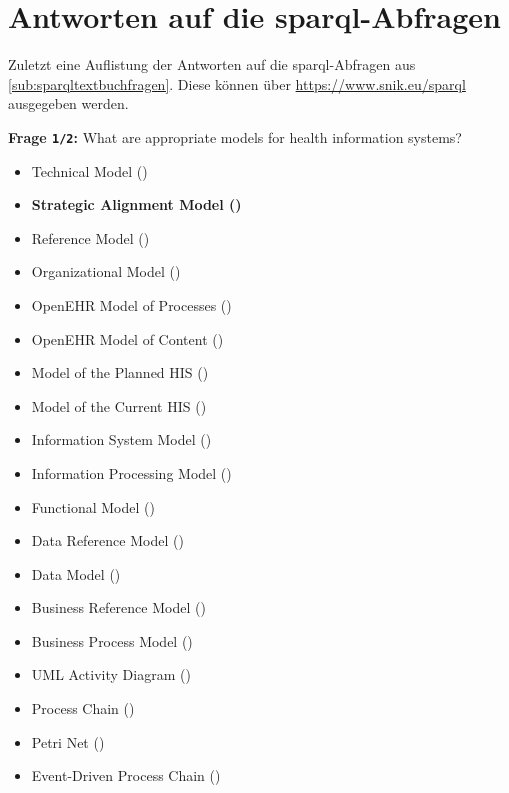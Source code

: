 \section[Antworten auf die SPARQL-Abfragen]{Antworten auf die \ac{sparql}-Abfragen}\label{sub:antwortentextbuch}

Zuletzt eine Auflistung der Antworten auf die \ac{sparql}-Abfragen aus \cref{sub:sparqltextbuchfragen}.
Diese können über \url{https://www.snik.eu/sparql} ausgegeben werden.

\textbf{Frage \texttt{1/2}:} What are appropriate models for health information systems?

\begin{itemize}
  \item Technical Model ()
  \item \textbf{ Strategic Alignment Model ()}
  \item Reference Model ()
  \item Organizational Model ()
  \item OpenEHR Model of Processes ()
  \item OpenEHR Model of Content ()
  \item Model of the Planned HIS ()
  \item Model of the Current HIS ()
  \item Information System Model ()
  \item Information Processing Model ()
  \item Functional Model ()
  \item Data Reference Model ()
  \item Data Model ()
  \item Business Reference Model ()
  \item Business Process Model ()
  \item UML Activity Diagram ()
  \item Process Chain ()
  \item Petri Net ()
  \item Event-Driven Process Chain ()

\end{itemize}
